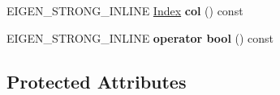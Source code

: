 \begin{DoxyCompactItemize}
E\+I\+G\+E\+N\+\_\+\+S\+T\+R\+O\+N\+G\+\_\+\+I\+N\+L\+I\+NE \hyperlink{namespace_eigen_a62e77e0933482dafde8fe197d9a2cfde}{Index} {\bfseries col} () const
\item 
\mbox{\label{class_eigen_1_1internal_1_1binary__evaluator_3_01_cwise_binary_op_3_01_binary_op_00_01_lhs_00_012b4683c8809d5a8c88ca2030de640ed2_a50cb49f37d910c97b15b792f225423ce}} 
E\+I\+G\+E\+N\+\_\+\+S\+T\+R\+O\+N\+G\+\_\+\+I\+N\+L\+I\+NE {\bfseries operator bool} () const
\end{DoxyCompactItemize}
\subsection*{Protected Attributes}
